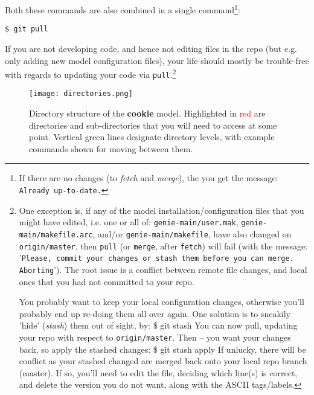 Both these commands are also combined in a single command\footnote{If there are no changes (to \textit{fetch} and \textit{merge}), the you get the message: \texttt{Already up-to-date.}}:

\vspace{-2mm}
\begin{verbatim}
$ git pull
\end{verbatim}
\vspace{-2mm}

If you are not developing code, and hence not editing files in the repo (but e.g. only adding new model configuration files), your life should mostly be trouble-free with regards to updating your code via \texttt{pull}.\footnote{
One exception is, if any of the model installation/configuration files that you might have edited, i.e. one or all of: \texttt{genie-main/user.mak}, \texttt{genie-main/makefile.arc}, and/or \texttt{genie-main/makefile}, have also changed on \texttt{origin/master}, then \texttt{pull} (or \texttt{merge}, after \texttt{fetch}) will fail (with the message: '\texttt{Please, commit your changes or stash them before you can merge. Aborting}'). The root issue is a conflict between remote file changes, and local ones that you had not committed to your repo.

You probably want to keep your local configuration changes, otherwise you'll probably end up re-doing them all over again. One solution is to sneakily 'hide' (\textit{stash}) them out of sight, by:
\$ git stash
\noindent You can now pull, updating your repo with respect to \texttt{origin/master}. Then -- you want your changes back, so apply the stashed changes:
\$ git stash apply
If unlucky, there will be conflict as your stashed changed are merged back onto your local repo branch (master). If so, you'll need to edit the file, deciding which line(s) is correct, and delete the version you do not want, along with the ASCII tags/labels.
}


\begin{figure}
\texttt{[image: directories.png]}
\caption{Directory structure of the \textbf{cookie} model. Highlighted in \textcolor{red}{red} are directories and sub-directories that you will need to access at some point. Vertical \textcolor[rgb]{0,0.501961,0}{green} lines designate directory levels, with example commands shown for moving between them.}
\label{fig:directories}
\end{figure}

